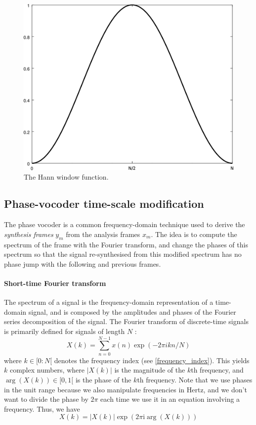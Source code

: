 \documentclass[letterpaper]{article}
\theoremstyle{definition}
\theoremstyle{remark}
\begin{document}
\begin{figure}[h]
\includegraphics[width=\linewidth]{hann.png}
\caption{The Hann window function.}
\end{figure}

\subsection{Phase-vocoder time-scale modification}
The phase vocoder is a common frequency-domain technique used to derive the
\emph{synthesis frames} \(y_m\)  from the analysis frames \(x_m\). The idea
is to compute the spectrum of the frame with the Fourier transform, and change
the phases of this spectrum so that the signal re-synthesised from this modified
spectrum has no phase jump with the following and previous frames.
\paragraph{Short-time Fourier transform}
The spectrum of a signal is the frequency-domain representation of
a time-domain signal, and is composed by the amplitudes and phases of the
Fourier series decomposition of the signal. The Fourier transform of
discrete-time signals is primarily defined for signals of length \(N\)
\citep{bracewell1986fourier}:
\begin{equation}
	X(k) = \sum_{n=0}^{N-1}x(n)\exp(-2\pi ikn/N)
\end{equation}
where \(k\in [0:N[\) denotes the frequency index (see \eqref{frequency_index}).
This yields \(k\) complex numbers, where \(|X(k)|\) is the magnitude of the
\(k\)th frequency, and \(\arg(X(k))\in[0,1[\) is the phase of the \(k\)th
frequency. Note that we use phases in the unit range because we also manipulate
frequencies in Hertz, and we don't want to divide the phase by \(2\pi\) each
time we use it in an equation
involving a frequency. Thus, we have
\begin{equation}
	X(k)= |X(k)|\exp(2\pi \text{i} \arg(X(k)))
\end{equation}
\end{document}
